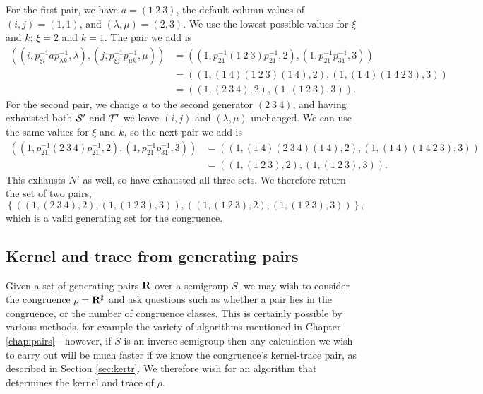 \begin{example}
  For the first pair, we have $a = (1~2~3)$, the default column values of
  $(i,j)=(1,1)$, and $(\lambda,\mu)=(2,3)$.  We use the lowest possible values
  for $\xi$ and $k$: $\xi = 2$ and $k = 1$.  The pair we add is
  \begin{align*}
    \left(
      (i, p_{\xi i}^{-1}ap_{\lambda k}^{-1}, \lambda),
      (j, p_{\xi j}^{-1}p_{\mu k}^{-1}, \mu)
    \right)
    &= \left(
      (1, p_{2 1}^{-1}(1~2~3)p_{2 1}^{-1}, 2),
      (1, p_{2 1}^{-1}p_{3 1}^{-1}, 3)
    \right) \\
    &= \left(
      \left(1, (1~4)(1~2~3)(1~4), 2\right),
      \left(1, (1~4)(1~4~2~3), 3\right)
    \right) \\
    &= \left(
      \left(1, (2~3~4), 2\right),
      \left(1, (1~2~3), 3\right)
    \right).
  \end{align*}
  For the second pair, we change $a$ to the second generator $(2~3~4)$, and
  having exhausted both $\mathcal{S}'$ and $\mathcal{T}'$ we leave $(i,j)$ and $(\lambda,\mu)$
  unchanged.  We can use the same values for $\xi$ and $k$, so the next pair we
  add is
  \begin{align*}
    \left(
      (1, p_{2 1}^{-1}(2~3~4)p_{2 1}^{-1}, 2),
      (1, p_{2 1}^{-1}p_{3 1}^{-1}, 3)
    \right)
    &= \left(
      \left(1, (1~4)(2~3~4)(1~4), 2\right),
      \left(1, (1~4)(1~4~2~3), 3\right)
    \right) \\
    &= \left(
      \left(1, (1~2~3), 2\right),
      \left(1, (1~2~3), 3\right)
    \right).
  \end{align*}
  This exhausts $N'$ as well, so have exhausted all three sets.  We therefore
  return the set of two pairs,
  $$\left\{
    \left(
      \left(1, (2~3~4), 2\right),
      \left(1, (1~2~3), 3\right)
    \right),
    \left(
      \left(1, (1~2~3), 2\right),
      \left(1, (1~2~3), 3\right)
    \right)
  \right\},$$
  which is a valid generating set for the congruence.
\end{example}

\subsection{Kernel and trace from generating pairs}
\label{sec:pairs-to-kertr}

Given a set of generating pairs $\mathbf{R}$ over a semigroup $S$, we may wish
to consider the congruence $\rho = \mathbf{R}^\sharp$ and ask questions such as
whether a pair lies in the congruence, or the number of congruence classes.
This is certainly possible by various methods, for example the variety of
algorithms mentioned in Chapter \ref{chap:pairs}---however, if $S$ is an inverse
semigroup then any calculation we wish to carry out will be much faster if we
know the congruence's kernel-trace pair, as described in Section
\ref{sec:kertr}.  We therefore wish for an algorithm that determines the kernel
and trace of $\rho$.

